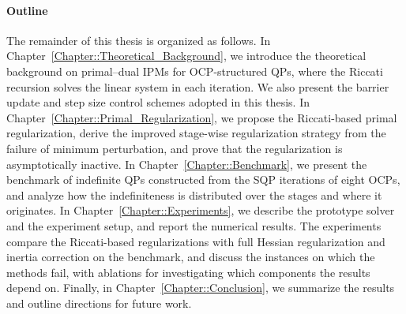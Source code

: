 \documentclass[class=scrbook, crop=false]{standalone}
\begin{document}
\paragraph{Outline}
The remainder of this thesis is organized as follows.
In Chapter~\ref{Chapter::Theoretical_Background}, 
we introduce the theoretical background on primal--dual \glspl{IPM} for \gls{OCP}-structured \glspl{QP},
where the Riccati recursion solves the linear system in each iteration.
We also present the barrier update and step size control schemes adopted in this thesis.
In Chapter~\ref{Chapter::Primal_Regularization},
we propose the Riccati-based primal regularization,
derive the improved stage-wise regularization strategy from the failure of minimum perturbation,
and prove that the regularization is asymptotically inactive.
In Chapter~\ref{Chapter::Benchmark}, we present the benchmark of indefinite \glspl{QP} constructed from the \gls{SQP} iterations of eight \glspl{OCP},
and analyze how the indefiniteness is distributed over the stages and where it originates.
In Chapter~\ref{Chapter::Experiments}, we describe the prototype solver and the experiment setup,
and report the numerical results.
The experiments compare the Riccati-based regularizations with full Hessian regularization and inertia correction on the benchmark,
and discuss the instances on which the methods fail, with ablations for investigating which components the results depend on.
Finally, in Chapter~\ref{Chapter::Conclusion}, we summarize the results and outline directions for future work.

\ifstandalone
    \printnoidxglossary[type=\acronymtype]
    \printbibliography[heading=bibintoc]
\fi
\end{document}
